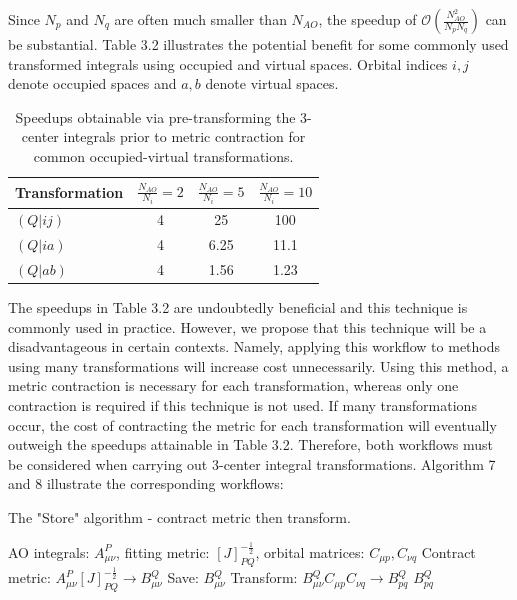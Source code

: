 \noindent Since $N_p$ and $N_q$ are often much smaller than $N_{AO}$, the speedup of 
$\mathcal{O}(\frac{N_{AO}^2}{N_pN_q})$ can be substantial. 
Table 3.2 illustrates the potential benefit for some commonly used transformed integrals using occupied and virtual spaces.
Orbital indices $i,j$ denote occupied spaces and $a,b$ denote virtual spaces.

\begingroup
\begin{table}[H]
\centering
\renewcommand{\baselinestretch}{1}
\caption{Speedups obtainable via pre-transforming the 3-center integrals prior to metric contraction for common occupied-virtual transformations.}
\begin{tabular}{l c c c}
\multicolumn{1}{l}{\textbf{Transformation}} &
\multicolumn{1}{c}{\textbf{$\frac{N_{AO}}{N_i}=2$}} & 
\multicolumn{1}{c}{\textbf{$\frac{N_{AO}}{N_i}=5$}} & 
\multicolumn{1}{c}{\textbf{$\frac{N_{AO}}{N_i}=10$}} \\ 
\hline
$(Q|ij)$       & 4               & 25              & 100      \\ 
$(Q|ia)$       & 4               & 6.25            & 11.1     \\ 
$(Q|ab)$        & 4              & 1.56            & 1.23     \\
\end{tabular}
\end{table}
\endgroup

The speedups in Table 3.2 are undoubtedly beneficial and this technique is commonly used in practice. 
However, we propose that this technique will be a disadvantageous in certain contexts. 
Namely, applying this workflow to methods using many transformations will increase cost unnecessarily. 
Using this method, a metric contraction is necessary for each transformation, whereas only one contraction is required if this technique is not used.
If many transformations occur, the cost of contracting the metric for 
each transformation will eventually outweigh the speedups attainable in Table 3.2. Therefore, both workflows must be considered when carrying
out 3-center integral transformations. Algorithm 7 and 8 illustrate the corresponding workflows:

\begin{algorithm}[H]
\caption{The "Store" algorithm - contract metric then transform.}
\begin{algorithmic}
\REQUIRE AO integrals: $A_{\mu \nu}^P$, fitting metric: $[J]_{PQ}^{-\frac{1}{2}}$, orbital matrices: $C_{\mu p}, C_{\nu q}$
\STATE Contract metric: $A_{\mu \nu}^P [J]_{PQ}^{-\frac{1}{2}} \rightarrow B_{\mu \nu}^Q$
\STATE Save: $B_{\mu \nu}^Q$
    \STATE Transform: $B_{\mu \nu}^QC_{\mu p}C_{\nu q} \rightarrow B_{p q}^Q$
\ENDFOR
\RETURN $B_{p q}^Q$
\end{algorithmic}
\end{algorithm}

